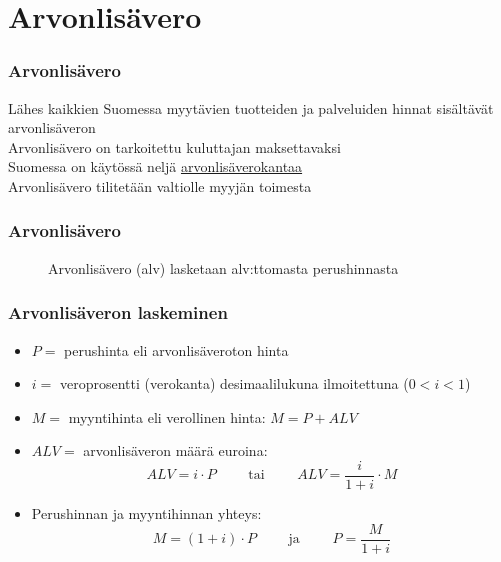 \documentclass[]{beamer}\usepackage[]{graphicx}\usepackage[]{color}
\newcommand{\pblock}{\\ \vspace{0.5cm}\pause}
\begin{document}
\section{Arvonlisävero}

\begin{frame}
  \frametitle{Arvonlisävero}
  \pause
  Lähes kaikkien Suomessa myytävien tuotteiden ja palveluiden hinnat sisältävät arvonlisäveron
  \pblock
  Arvonlisävero on tarkoitettu kuluttajan maksettavaksi
  \pblock
  Suomessa on käytössä neljä \href{http://www.veronmaksajat.fi/luvut/tilastot/kulutusverot/arvonlisavero/}{arvonlisäverokantaa}
  \pblock
  Arvonlisävero tilitetään valtiolle myyjän toimesta
\end{frame}

\begin{frame}
\frametitle{Arvonlisävero}
\pause
\begin{figure}
\caption{Arvonlisävero (alv) lasketaan alv:ttomasta perushinnasta}
\end{figure}
\end{frame}



\begin{frame}
\frametitle{Arvonlisäveron laskeminen}
	\begin{itemize}
		\item \(P =\) perushinta eli arvonlisäveroton hinta
		\item \(i =\) veroprosentti (verokanta) desimaalilukuna ilmoitettuna (\(0 < i < 1\))
		\item \(M =\) myyntihinta eli verollinen hinta: \(M = P + ALV\)
		\item \(ALV =\) arvonlisäveron määrä euroina:
			\[
				ALV = i \cdot P\qquad\text{ tai }\qquad ALV = \frac{i}{1 + i}\cdot M
			\]
		\item Perushinnan ja myyntihinnan yhteys:
			\[
				M = (1 + i) \cdot P \qquad\text{ ja }\qquad P = \frac{M}{1 + i}
			\]
	\end{itemize}
\end{frame}
\end{document}
